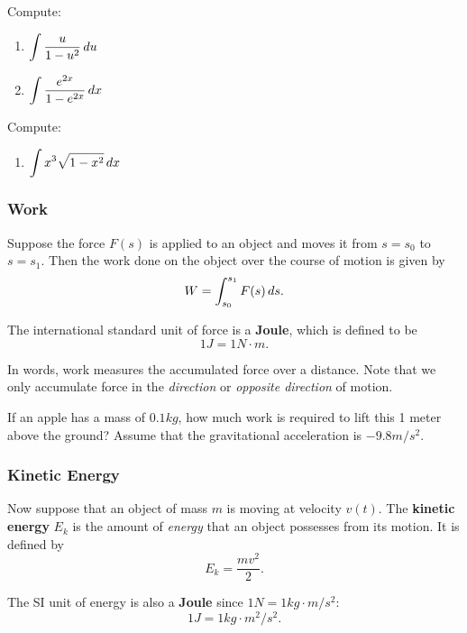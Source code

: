 \documentclass[10pt,t,handout,ignorenonframetext,aspectratio=169]{beamer}
\begin{document}
\begin{frame}
  \vs
  \begin{example}
    Compute:
    \begin{enumerate}
    \item $\displaystyle \int \frac{u}{1-u^2} \mathop{}\!d u$
    \item $\displaystyle \int \frac{e^{2x}}{1 - e^{2x}} \mathop{}\!d x$
    \end{enumerate}
  \end{example}
\end{frame}

\begin{frame}
  \vs
  \begin{example}
    Compute:
    \begin{enumerate}
    \item $\displaystyle \int x^3\sqrt{1-x^2}\mathop{}\!d x$
    \end{enumerate}
  \end{example}
\end{frame}


\begin{frame}
  \frametitle{Work}
  Suppose the force $F(s)$ is applied to an object and moves it from
  $s = s_0$ to $s = s_1$. Then the work done on the object over the
  course of motion is given by
  \[
    W = \int_{s_0}^{s_1} F(s) \mathop{}\!d s .
  \]

  The international standard unit of force is a \textbf{Joule}, which
  is defined to be
  \[
    1\unit{J} = 1\unit{N}\cdot\unit{m}.
  \]

  In words, work measures the accumulated force over a distance. Note
  that we only accumulate force in the \textit{direction} or
  \textit{opposite direction} of motion.
\end{frame}


\begin{frame}
  \vs
  \begin{example}
    If an apple has a mass of $0.1\unit{kg}$, how much work is required
    to lift this 1 meter above the ground? Assume that the gravitational
    acceleration is $-9.8\unit{m}/\unit{s}^2$.
  \end{example}
\end{frame}


\begin{frame}
  \frametitle{Kinetic Energy}
  Now suppose that an object of mass $m$ is moving at velocity $v(t)$.
  The \textbf{kinetic energy} $E_k$ is the amount of \textit{energy}
  that an object possesses from its motion. It is defined by
  \[
    E_k = \frac{m  v^2}{2}.
  \]

  The SI unit of energy is also a \textbf{Joule} since
  $1\unit{N} = 1\unit{kg}\cdot\unit{m}/\unit{s}^2$:
  \[
    1\unit{J} = 1\unit{kg}\cdot \unit{m}^2/\unit{s}^2 .
  \]
\end{frame}
\end{document}

